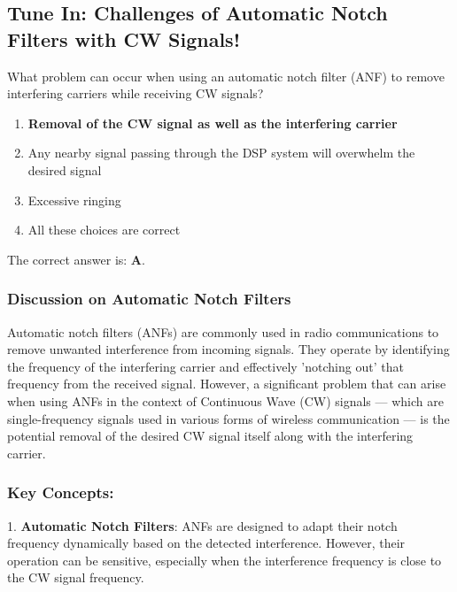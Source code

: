 \subsection{Tune In: Challenges of Automatic Notch Filters with CW Signals!}

\begin{tcolorbox}[colback=gray!10, colframe=black, title=E4E01] What problem can occur when using an automatic notch filter (ANF) to remove interfering carriers while receiving CW signals? 

\begin{enumerate}[label=\Alph*.]
    \item \textbf{Removal of the CW signal as well as the interfering carrier}
    \item Any nearby signal passing through the DSP system will overwhelm the desired signal
    \item Excessive ringing
    \item All these choices are correct
\end{enumerate} \end{tcolorbox}

The correct answer is: \textbf{A}. 

\subsubsection{Discussion on Automatic Notch Filters}

Automatic notch filters (ANFs) are commonly used in radio communications to remove unwanted interference from incoming signals. They operate by identifying the frequency of the interfering carrier and effectively 'notching out' that frequency from the received signal. However, a significant problem that can arise when using ANFs in the context of Continuous Wave (CW) signals — which are single-frequency signals used in various forms of wireless communication — is the potential removal of the desired CW signal itself along with the interfering carrier.

\subsubsection*{ Key Concepts:}

1. \textbf{Automatic Notch Filters}: ANFs are designed to adapt their notch frequency dynamically based on the detected interference. However, their operation can be sensitive, especially when the interference frequency is close to the CW signal frequency.

